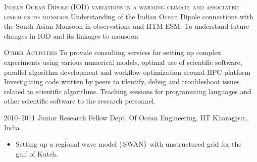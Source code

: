\documentclass[]{cv-style}          %
\begin{document}
\begin{outline}
    \1 \textsc{Indian Ocean Dipole (IOD) variations in a warming climate and associated linkages to monsoon}
        \2 Understanding of the Indian Ocean Dipole connections with the South Asian Monsoon in observations and IITM ESM.
        \2 To understand future changes in IOD and its linkages to monsoon
    
    \1 \textsc{Other Activities}
        \2 To provide consulting services for setting up complex experiments using various numerical models, optimal use of scientific software, parallel algorithm development and workflow optimization around HPC platform
        \2 Investigating code written by peers to identify, debug and troubleshoot issues related to scientific algorithms.
        \2 Teaching sessions for programming languages and other scientific software to the research personnel.
\end{outline}

\begin{exprlist}
  \expr
  {2010--2011}
  {Junior Research Fellow}
  {Dept. Of Ocean Engineering, IIT Kharagpur, India}
\end{exprlist}
\begin{itemize}
    \item Setting up a regional wave model (\,SWAN)\, with unstructured grid for the gulf of Kutch.
\end{itemize}
\end{document}
